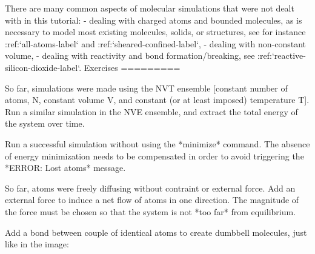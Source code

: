 There are many common aspects of molecular simulations that were not dealt with in this
tutorial:
- dealing with charged atoms and bounded molecules, as is necessary to model most existing molecules, solids, or structures, see for instance :ref:`all-atoms-label` and :ref:`sheared-confined-label`,
- dealing with non-constant volume,
- dealing with reactivity and bond formation/breaking, see :ref:`reactive-silicon-dioxide-label`.
Exercises
=========

So far, simulations were made using the NVT ensemble [constant number 
of atoms, N, constant volume V, and constant (or at least imposed)
temperature T].
Run a similar simulation in the NVE ensemble, and extract the
total energy of the system over time.

Run a successful simulation without using the *minimize* command.
The absence of energy minimization needs to be compensated
in order to avoid triggering the *ERROR: Lost atoms* message.

So far, atoms were freely diffusing without contraint or external force.
Add an external force to induce a net flow of atoms in one
direction. The magnitude of the force must be chosen so
that the system is not *too far* from equilibrium.

Add a bond between couple of identical atoms to create
dumbbell molecules, just like in the image:

